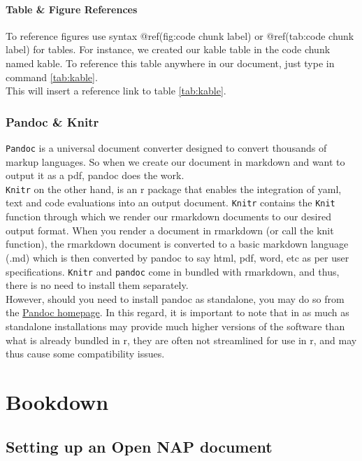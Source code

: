 \documentclass[
]{book}
\begin{document}
\hypertarget{table-figure-references}{%
\subsubsection{Table \& Figure References}\label{table-figure-references}}

To reference figures use syntax @ref(fig:code chunk label) or @ref(tab:code chunk label) for tables.
For instance, we created our kable table in the code chunk named kable. To reference this table anywhere in our document, just type in command \ref{tab:kable}.\\
This will insert a reference link to table \ref{tab:kable}.

\hypertarget{pandoc-knitr}{%
\subsection{Pandoc \& Knitr}\label{pandoc-knitr}}

\texttt{Pandoc} is a universal document converter designed to convert thousands of markup languages. So when we create our document in markdown and want to output it as a pdf, pandoc does the work.\\
\texttt{Knitr} on the other hand, is an r package that enables the integration of yaml, text and code evaluations into an output document. \texttt{Knitr} contains the \texttt{Knit} function through which we render our rmarkdown documents to our desired output format.
When you render a document in rmarkdown (or call the knit function), the rmarkdown document is converted to a basic markdown language (.md) which is then converted by pandoc to say html, pdf, word, etc as per user specifications.
\texttt{Knitr} and \texttt{pandoc} come in bundled with rmarkdown, and thus, there is no need to install them separately.\\
However, should you need to install pandoc as standalone, you may do so from the \href{http://pandoc.org}{Pandoc homepage}. In this regard, it is important to note that in as much as standalone installations may provide much higher versions of the software than what is already bundled in r, they are often not streamlined for use in r, and may thus cause some compatibility issues.

\hypertarget{bookdown}{%
\chapter{Bookdown}\label{bookdown}}

\hypertarget{setting-up-an-open-nap-document}{%
\section{Setting up an Open NAP document}\label{setting-up-an-open-nap-document}}
\end{document}
